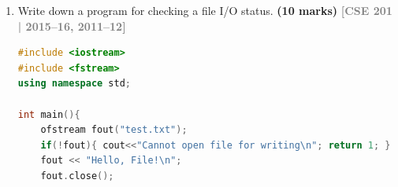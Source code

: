 \documentclass[12pt,a3paper]{article}
\newcommand{\yr}[1]{\hfill\textcolor{gray}{\small\textbf{[#1]}}}
\newcommand{\mk}[1]{\textcolor{orange!70!black}{\small\textbf{(#1 marks)}}}
\begin{document}
\begin{enumerate}
\begin{tcolorbox}
\begin{lstlisting}[language=C++]
    // Inserter (output)
    friend ostream& operator<<(ostream& out, const plate& p) {
        out << "Place : " << p.name     << endl
            << "Lat   : " << p.latitude  << " deg" << endl
            << "Long  : " << p.longitude << " deg" << endl;
        return out;
    }

    // setup manipulator: converts decimal degrees to minutes
    friend ostream& setup(ostream& out) {
        // This is a state flag trick; for simplicity we
        // demonstrate conversion directly in a method
        return out;
    }

    void printInMinutes() const {
        cout << "Place : " << name << endl
             << "Lat   : " << latitude  * 60 << " min" << endl
             << "Long  : " << longitude * 60 << " min" << endl;
    }
};

// setup as a proper manipulator using ios_base
ostream& setup(ostream& out) { return out; }

int main() {
    plate p;
    cin >> p;
    cout << p;
    cout << "\n--- In Minutes ---" << endl;
    p.printInMinutes();
    return 0;
}
\end{lstlisting}
\textbf{Sample interaction:}
\begin{verbatim}
Enter name: Dhaka
Enter latitude (decimal degrees): 23.8103
Enter longitude (decimal degrees): 90.4125
Place : Dhaka
Lat   : 23.8103 deg
Long  : 90.4125 deg

--- In Minutes ---
Place : Dhaka
Lat   : 1428.62 min
Long  : 5424.75 min
\end{verbatim}
\end{tcolorbox}

\item Write down a program for checking a file I/O status. \mk{10}
\yr{CSE 201 | 2015--16, 2011--12}
\begin{tcolorbox}[enhanced,breakable,ansbox,colback=cA!4,colframe=cA,
  boxrule=0.8pt,arc=5pt,
  title={\textbf{Answer --- File I/O status check program}},
  fonttitle=\bfseries\color{white},colbacktitle=cA]

\begin{lstlisting}[language=C++]
#include <iostream>
#include <fstream>
using namespace std;

int main(){
    ofstream fout("test.txt");
    if(!fout){ cout<<"Cannot open file for writing\n"; return 1; }
    fout << "Hello, File!\n";
    fout.close();


\end{lstlisting}
\end{tcolorbox}
\end{enumerate}
\end{document}
